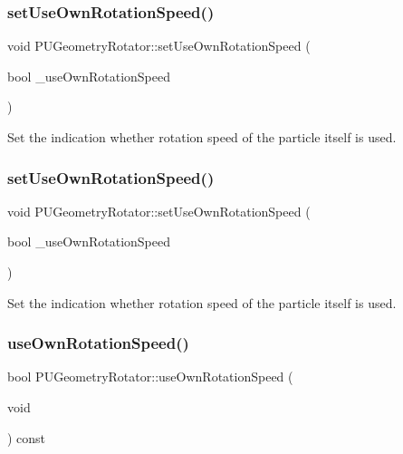 \subsubsection{\texorpdfstring{set\+Use\+Own\+Rotation\+Speed()}{setUseOwnRotationSpeed()}\hspace{0.1cm}{\footnotesize\ttfamily [1/2]}}
{\footnotesize\ttfamily void P\+U\+Geometry\+Rotator\+::set\+Use\+Own\+Rotation\+Speed (\begin{DoxyParamCaption}\item[{bool}]{\+\_\+use\+Own\+Rotation\+Speed }\end{DoxyParamCaption})}

Set the indication whether rotation speed of the particle itself is used. \mbox{\label{classPUGeometryRotator_a7245251b9b42b431685bca5a6066caff}} 
\subsubsection{\texorpdfstring{set\+Use\+Own\+Rotation\+Speed()}{setUseOwnRotationSpeed()}\hspace{0.1cm}{\footnotesize\ttfamily [2/2]}}
{\footnotesize\ttfamily void P\+U\+Geometry\+Rotator\+::set\+Use\+Own\+Rotation\+Speed (\begin{DoxyParamCaption}\item[{bool}]{\+\_\+use\+Own\+Rotation\+Speed }\end{DoxyParamCaption})}

Set the indication whether rotation speed of the particle itself is used. \mbox{\label{classPUGeometryRotator_a112e63c42288c669fd121000a75444ba}} 
\subsubsection{\texorpdfstring{use\+Own\+Rotation\+Speed()}{useOwnRotationSpeed()}\hspace{0.1cm}{\footnotesize\ttfamily [1/2]}}
{\footnotesize\ttfamily bool P\+U\+Geometry\+Rotator\+::use\+Own\+Rotation\+Speed (\begin{DoxyParamCaption}\item[{void}]{ }\end{DoxyParamCaption}) const}

